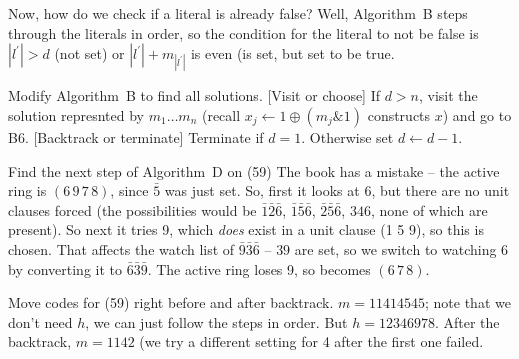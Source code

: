 Now, how do we check if a literal is already false?  Well, Algorithm~B steps
through the literals in order, so the condition for the literal to not be false is
$| l^{\prime} | > d$ (not set) or $| l^{\prime} | + m_{| l^{\prime} |}$ is even (is set,
but set to be true.

 Modify Algorithm~B to find all solutions.
  [Visit or choose] If $d > n$, visit the solution represnted by $m_1 \ldots m_n$
(recall $x_j \gets 1 \oplus \left( m_j \& 1 \right)$ constructs $x$) and go to B6.
 [Backtrack or terminate] Terminate if $d=1$.  Otherwise set $d \gets d - 1$.

 Find the next step of Algorithm~D on (59)\hfil\break
The book has a mistake -- the active ring is $\left(6\,9\,7\,8\right)$, since 
$\bar 5$ was just set.  So, first it looks at 6, but there are no unit clauses forced
(the possibilities would be $\bar 1 \bar 2 \bar 6$, $\bar 1 \bar 5 \bar 6$, $\bar 2 \bar 5 \bar 6$,
$346$, none of which are present). So next it tries 9, which {\it does} exist in a unit 
clause (1 5 9), so this is chosen.  That affects the watch list of $\bar 9 \bar 3 \bar 6$ --
$39$ are set, so we switch to watching 6 by converting it to $\bar 6 \bar 3 \bar 9$.
The active ring loses 9, so becomes $\left(6\,7\,8\right)$.

 Move codes for (59) right before and after backtrack.\hfil\break
$m = 1 1 4 1 4 5 4 5$; note that we don't need $h$, we can just follow the steps
in order.  But $h = 1 2 3 4 6 9 7 8$.  After the backtrack, $m = 1 1 4 2$ (we try
a different setting for 4 after the first one failed.

